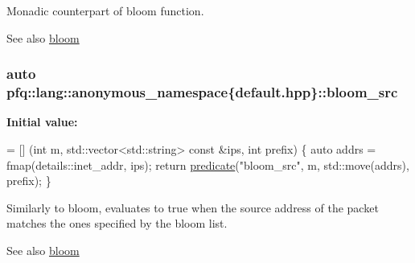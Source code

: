 Monadic counterpart of {\ttfamily bloom} function. 

\begin{DoxySeeAlso}{See also}
\hyperlink{namespacepfq_1_1lang_1_1anonymous__namespace_02default_8hpp_03_abfcd230137acb93cfd99f7a0a7c1f17f}{bloom} 
\end{DoxySeeAlso}
\subsubsection[{\texorpdfstring{bloom\+\_\+src}{bloom_src}}]{\setlength{\rightskip}{0pt plus 5cm}auto pfq\+::lang\+::anonymous\+\_\+namespace\{default.\+hpp\}\+::bloom\+\_\+src}\hypertarget{namespacepfq_1_1lang_1_1anonymous__namespace_02default_8hpp_03_aa2a8ff506d61e93d8eca4419513970f4}{}\label{namespacepfq_1_1lang_1_1anonymous__namespace_02default_8hpp_03_aa2a8ff506d61e93d8eca4419513970f4}
{\bfseries Initial value\+:}
\begin{DoxyCode}
= [] (\textcolor{keywordtype}{int} m, std::vector<std::string> \textcolor{keyword}{const} &ips, \textcolor{keywordtype}{int} prefix) \{
                                \textcolor{keyword}{auto} addrs = fmap(details::inet\_addr, ips);
                                \textcolor{keywordflow}{return} \hyperlink{namespacepfq_1_1lang_aca9adafc436b7f851621b979fa1aaf88}{predicate}(\textcolor{stringliteral}{"bloom\_src"}, m, std::move(addrs), prefix);
                          \}
\end{DoxyCode}
Similarly to {\ttfamily bloom}, evaluates to {\ttfamily true} when the source address of the packet matches the ones specified by the bloom list. \begin{DoxySeeAlso}{See also}
\hyperlink{namespacepfq_1_1lang_1_1anonymous__namespace_02default_8hpp_03_abfcd230137acb93cfd99f7a0a7c1f17f}{bloom} 
\end{DoxySeeAlso}
